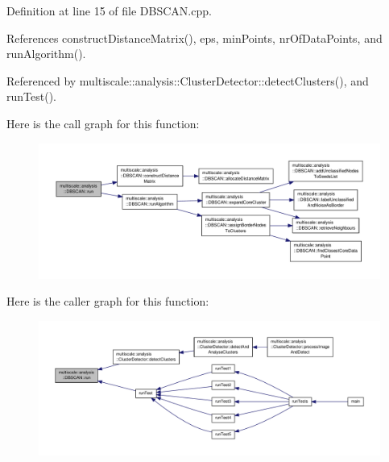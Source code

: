 Definition at line 15 of file D\-B\-S\-C\-A\-N.\-cpp.



References construct\-Distance\-Matrix(), eps, min\-Points, nr\-Of\-Data\-Points, and run\-Algorithm().



Referenced by multiscale\-::analysis\-::\-Cluster\-Detector\-::detect\-Clusters(), and run\-Test().



Here is the call graph for this function\-:\nopagebreak
\begin{figure}[H]
\begin{center}
\leavevmode
\includegraphics[width=350pt]{classmultiscale_1_1analysis_1_1DBSCAN_a52f0eb2d04029c75a3c48a37efdac26b_cgraph}
\end{center}
\end{figure}




Here is the caller graph for this function\-:\nopagebreak
\begin{figure}[H]
\begin{center}
\leavevmode
\includegraphics[width=350pt]{classmultiscale_1_1analysis_1_1DBSCAN_a52f0eb2d04029c75a3c48a37efdac26b_icgraph}
\end{center}
\end{figure}


